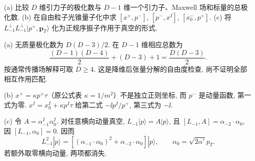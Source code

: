 \begin{exercise}
(a) 比较 $D$ 维引力子的极化数与 $D-1$ 维一个引力子、Maxwell 场和标量的总极化数.
(b) 在自由粒子光锥量子化中求
$[x^+,p^-]$, $[p^-,x^I]$, $[x_0^-,p^+]$.
(c) 将 $L_{-1}^\perp L_{-1}^\perp|p^+,\boldsymbol p_T\rangle$ 化为正规序振子作用于真空的形式.
\end{exercise}
\begin{solution}
(a) 无质量极化数为 $D(D-3)/2$. 在 $D-1$ 维相应总数为
\[
 \frac{(D-1)(D-4)}2+(D-3)+1=\frac{D(D-3)}2.
\]
按通常传播场解释可取 $D\geq4$. 这是降维后张量分解的自由度检查, 尚不证明全部相互作用匹配.

(b) $x^+=\kappa p^+\tau$（原公式表 $\kappa=1/m^2$）不是独立正则坐标, 而 $p^-$ 是动量函数, 第一式为零. $x^I=x_0^I+\kappa p^I\tau$ 给第二式 $-\ii p^I/p^+$, 第三式为 $-\ii$.

(c) 令 $A=\alpha_{-1}^I\alpha_0^I$. 对任意横向动量真空, $L_{-1}|p\rangle=A|p\rangle$, 且
$[L_{-1},A]=\alpha_{-2}\cdot\alpha_0$, 因 $[L_{-1},\alpha_0]=0$. 因而
\[
 L_{-1}^2|p\rangle=
 [(\alpha_{-1}\cdot\alpha_0)^2+\alpha_{-2}\cdot\alpha_0]|p\rangle,\qquad
 \alpha_0=\sqrt{2\alpha'}p_T.
\]
若额外取零横向动量, 两项都消失.
\end{solution}

